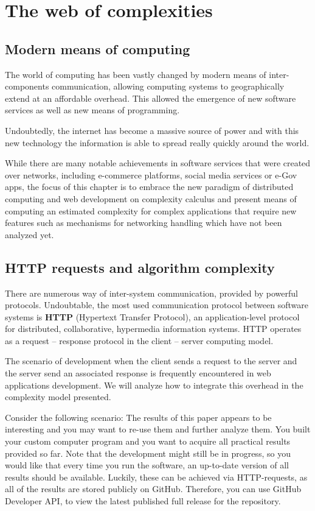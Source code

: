 \chapter{The web of complexities}

\section{Modern means of computing}
The world of computing has been vastly changed by modern means of inter-components communication, allowing computing systems to geographically extend at an affordable overhead. This allowed the emergence of new software services as well as new means of programming. 

Undoubtedly, the internet has become a massive source of power and with this new technology the information is able to spread really quickly around the world.

While there are many notable achievements in software services that were created over networks, including e-commerce platforms, social media services or e-Gov apps, the focus of this chapter is to embrace the new paradigm of distributed computing and web development on complexity calculus and present means of computing an estimated complexity for complex applications that require new features such as mechanisms for networking handling which have not been analyzed yet.

\section{HTTP requests and algorithm complexity}

There are numerous way of inter-system communication, provided by powerful protocols. Undoubtable, the most used communication protocol between software systems is \textbf{HTTP} (Hypertext Transfer Protocol), an application-level protocol for distributed, collaborative, hypermedia information systems. HTTP operates as a request – response protocol in the client – server computing model.

The scenario of development when the client sends a request to the server and the server send an associated response is frequently encountered in web applications development. We will analyze how to integrate this overhead in the complexity model presented.

Consider the following scenario: The results of this paper appears to be interesting and you may want to re-use them and further analyze them. You built your custom computer program and you want to acquire all practical results provided so far. Note that the development might still be in progress, so you would like that every time you run the software, an up-to-date version of all results should be available. Luckily, these can be achieved via HTTP-requests, as all of the results are stored publicly on GitHub. Therefore, you can use GitHub Developer API, to view the latest published full release for the repository.

